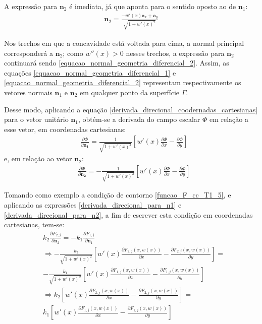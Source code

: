 A expressão para $\mathbf{n}_2$ é imediata, já que aponta para o sentido oposto ao de $\mathbf{n}_1$:
\begin{align}
\mathbf{n}_2 = \frac{ -w'(x)\mathbf{a}_x + \mathbf{a}_y }{\sqrt{ 1 + w'(x)^2 }} \label{equacao_normal_geometria_diferencial_2}
\end{align}

Nos trechos em que a concavidade está voltada para cima, a normal principal corresponderá a $\mathbf{n}_2$; como $w''(x) > 0$ nesses trechos, a expressão para $\mathbf{n}_2$ continuará sendo \eqref{equacao_normal_geometria_diferencial_2}. Assim, as equações \eqref{equacao_normal_geometria_diferencial_1} e \eqref{equacao_normal_geometria_diferencial_2} representam respectivamente os vetores normais $\mathbf{n}_1$ e $\mathbf{n}_2$ em qualquer ponto da superfície $\Gamma$.




Desse modo, aplicando a equação \eqref{derivada_direcional_coodernadas_cartesianas} para o vetor unitário $\mathbf{n}_1$, obtém-se a derivada do campo escalar $\Phi$
em relação a esse vetor, em coordenadas cartesianas: 
\begin{align}
& \frac{\partial\Phi}{\partial\mathbf{n_1}} = \frac{1}{\sqrt{1 + w'(x)^2}}\left[w'(x)\frac{\partial \Phi}{\partial x} - \frac{\partial \Phi}{\partial y}\right]
\label{derivada_direcional_para_n1}
\end{align} 
e, em relação ao vetor $\mathbf{n}_2$:
\begin{align}
& \frac{\partial\Phi}{\partial\mathbf{n_2}} = -\frac{1}{\sqrt{1 + w'(x)^2}}\left[w'(x)\frac{\partial \Phi}{\partial x} - \frac{\partial \Phi}{\partial y}\right]
\label{derivada_direcional_para_n2}
\end{align} 

Tomando como exemplo a condição de contorno \eqref{funcao_F_cc_T1_5}, e aplicando as expressões \eqref{derivada_direcional_para_n1} e \eqref{derivada_direcional_para_n2},
a fim de escrever esta condição em coordenadas cartesianas,
tem-se:
\begin{align}
& k_2\frac{\partial F_{2, j}}{\partial\mathbf{n}_2} = - k_1\frac{\partial F_{1,j}}{\partial\mathbf{n}_1} \nonumber \\
& \Rightarrow -\frac{k_2}{\sqrt{1 + w'(x)^2}}\left[w'(x)\frac{\partial F_{2,j}(x, w(x))}{\partial x} - \frac{\partial F_{2,j}(x, w(x))}{\partial y}\right] = \nonumber \\
& -\frac{k_1}{\sqrt{1 + w'(x)^2}}\left[w'(x)\frac{\partial F_{1,j}(x, w(x))}{\partial x} - \frac{\partial F_{1,j}(x, w(x))}{\partial y}\right] \nonumber \\
& \Rightarrow k_2\left[w'(x)\frac{\partial F_{2,j}(x, w(x))}{\partial x} - \frac{\partial F_{2,j}(x, w(x))}{\partial y}\right] = \nonumber \\
& k_1 \left[w'(x)\frac{\partial F_{1,j}(x, w(x))}{\partial x} - \frac{\partial F_{1,j}(x, w(x))}{\partial y}\right]
\end{align}

